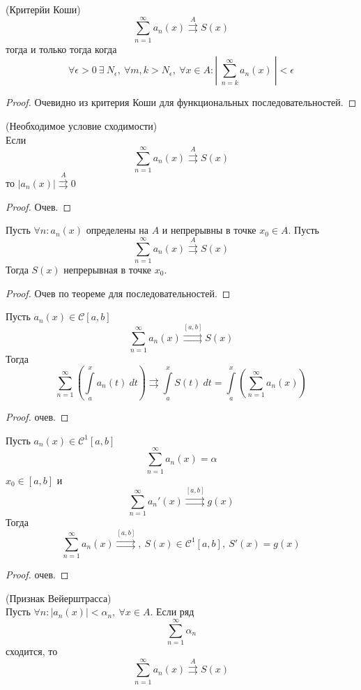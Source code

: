 \begin{theorem} (Критерйи Коши)\\
    \[\sum_{n=1}^{\infty}a_n(x)\overset{A}{\rightrightarrows}S(x)\]
    тогда и только тогда когда
    \[\forall \epsilon>0\ \exists\ N_{\epsilon},\ \forall m,k>N_{\epsilon},\ \forall x\in A: \left|\ \sum_{n=k}^{\infty}a_n(x)\ \right|<\epsilon\]
\end{theorem}
\begin{proof}
    Очевидно из критерия Коши для функциональных последовательностей.
\end{proof}
\begin{theorem} (Необходимое условие сходимости)\\
    Если
    \[\sum_{n=1}^{\infty}a_n(x)\overset{A}{\rightrightarrows}S(x)\]
    то $|a_n(x)|\overset{A}{\rightrightarrows}0$
\end{theorem}
\begin{proof}
    Очев.
\end{proof}
\begin{theorem}
    Пусть $\forall n: a_n(x)$ определены на $A$ и непрерывны в точке $x_0\in A$. Пусть
    \[\sum_{n=1}^{\infty}a_n(x)\overset{A}{\rightrightarrows}S(x)\]
    Тогда $S(x)$ непрерывная в точке $x_0$.
\end{theorem}
\begin{proof}
    Очев по теореме для последовательностей.
\end{proof}
\begin{theorem}
    Пусть $a_n(x)\in \mathcal{C}[a,b]$
    \[\sum_{n=1}^{\infty}a_n(x)\overset{[a,b]}{\rightrightarrows} S(x)\]
    Тогда 
    \[\sum_{n=1}^{\infty}\left(\int\limits_{a}^{x}a_n(t)\ dt\right)\rightrightarrows \int\limits_{a}^{x}S(t)\ dt=\int\limits_{a}^{x}\left(\sum_{n=1}^{\infty}a_n(x)\right)\]
\end{theorem}
\begin{proof}
    очев.
\end{proof}
\begin{theorem}
    Пусть $a_n(x)\in \mathcal{C}^1{[a,b]}$
    \[\sum_{n=1}^{\infty}a_n(x)=\alpha\]
    $x_0\in [a,b]$ и 
    \[\sum_{n=1}^{\infty}a_n'(x)\overset{[a,b]}\rightrightarrows g(x)\]
    Тогда
    \[\sum_{n=1}^{\infty}a_n(x)\overset{[a,b]}{\rightrightarrows},\ S(x)\in \mathcal{C}^1[a,b],\ S'(x)=g(x)\]
\end{theorem}
\begin{proof}
    очев.
\end{proof}
\begin{theorem} (Признак Вейерштрасса)\\
    Пусть $\forall n: |a_n(x)|<\alpha_n,\ \forall x\in A$. Если ряд
    \[\sum_{n=1}^{\infty}\alpha_n\]
    сходится, то
    \[\sum_{n=1}^{\infty}a_n(x)\overset{A}\rightrightarrows S(x)\]
\end{theorem}
